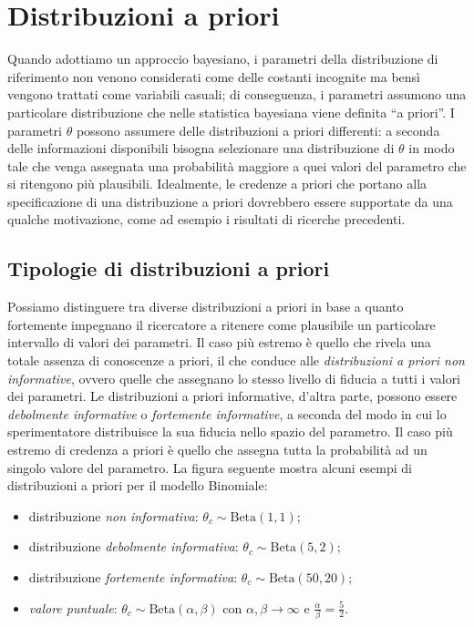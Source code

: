 \documentclass[
]{book}
\providecommand{\tightlist}{%
  \setlength{\itemsep}{0pt}\setlength{\parskip}{0pt}}
\theoremstyle{definition}
\theoremstyle{definition}
\theoremstyle{definition}
\theoremstyle{definition}
\theoremstyle{remark}
\begin{document}
\hypertarget{distribuzioni-a-priori}{%
\section{Distribuzioni a priori}\label{distribuzioni-a-priori}}

Quando adottiamo un approccio bayesiano, i parametri della distribuzione di riferimento non venono considerati come delle costanti incognite ma bensì vengono trattati come variabili casuali; di conseguenza, i parametri assumono una particolare distribuzione che nelle statistica bayesiana viene definita ``a priori''. I parametri \(\theta\) possono assumere delle distribuzioni a priori differenti: a seconda delle informazioni disponibili bisogna selezionare una distribuzione di \(\theta\) in modo tale che venga assegnata una probabilità maggiore a quei valori del parametro che si ritengono più plausibili. Idealmente, le credenze a priori che portano alla specificazione di una distribuzione a priori dovrebbero essere supportate da una qualche motivazione, come ad esempio i risultati di ricerche precedenti.

\hypertarget{tipologie-di-distribuzioni-a-priori}{%
\subsection{Tipologie di distribuzioni a priori}\label{tipologie-di-distribuzioni-a-priori}}

Possiamo distinguere tra diverse distribuzioni a priori in base a quanto fortemente impegnano il ricercatore a ritenere come plausibile un particolare intervallo di valori dei parametri. Il caso più estremo è quello che rivela una totale assenza di conoscenze a priori, il che conduce alle \emph{distribuzioni a priori non informative}, ovvero quelle che assegnano lo stesso livello di fiducia a tutti i valori dei parametri. Le distribuzioni a priori informative, d'altra parte, possono essere \emph{debolmente informative} o \emph{fortemente informative}, a seconda del modo in cui lo sperimentatore distribuisce la sua fiducia nello spazio del parametro. Il caso più estremo di credenza a priori è quello che assegna tutta la probabilità ad un singolo valore del parametro. La figura seguente mostra alcuni esempi di distribuzioni a priori per il modello Binomiale:

\begin{itemize}
\tightlist
\item
  distribuzione \emph{non informativa}: \(\theta_c \sim \mbox{Beta}(1,1)\);
\item
  distribuzione \emph{debolmente informativa}: \(\theta_c \sim \mbox{Beta}(5,2)\);
\item
  distribuzione \emph{fortemente informativa}: \(\theta_c \sim \mbox{Beta}(50,20)\);
\item
  \emph{valore puntuale}: \(\theta_c \sim \mbox{Beta}(\alpha, \beta)\) con \(\alpha, \beta \rightarrow \infty\) e \(\frac{\alpha}{\beta} = \frac{5}{2}\).
\end{itemize}
\end{document}
